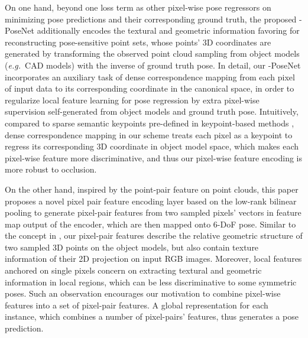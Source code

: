\documentclass[letterpaper, 10 pt, conference]{ieeeconf}
\def\eg{\emph{e.g.~}} \def\Eg{\emph{E.g.}~}
\begin{document}
On one hand, beyond one loss term as other pixel-wise pose regressors \cite{wang2019densefusion,cheng20196d} on minimizing pose predictions and their corresponding ground truth, the proposed -PoseNet additionally encodes the textural and geometric information favoring for reconstructing pose-sensitive point sets, 
whose points' 3D coordinates are generated by transforming the observed point cloud sampling from object models (\eg CAD models) with the inverse of ground truth pose.  
In detail, our -PoseNet incorporates an auxiliary task of dense correspondence mapping from each pixel of input data to its corresponding coordinate in the canonical space, in order to regularize local feature learning for pose regression by extra pixel-wise supervision self-generated from object models and ground truth pose. 
Intuitively, compared to sparse semantic keypoints pre-defined in keypoint-based methods \cite{newell2016stacked,oberweger2018making,pavlakos20176,rad2017bb8,peng2019pvnet}, dense correspondence mapping in our scheme treats each pixel as a keypoint to regress its corresponding 3D coordinate in object model space, which makes each pixel-wise feature more discriminative, and thus our pixel-wise feature encoding is more robust to occlusion. 
 
On the other hand, inspired by the point-pair feature \cite{drost2010model,hinterstoisser2016going} on point clouds, this paper proposes a novel pixel pair feature encoding layer based on the low-rank bilinear pooling \cite{kong2017low,wei2018grassmann} to generate pixel-pair features from two sampled pixels' vectors in feature map output of the encoder, which are then mapped onto 6-DoF pose.
Similar to the concept in \cite{drost2010model,hinterstoisser2016going}, our pixel-pair features describe the relative geometric structure of two sampled 3D points on the object models, but also contain texture information of their 2D projection on input RGB images.
Moreover, local features anchored on single pixels concern on extracting textural and geometric information in local regions, which can be less discriminative to some symmetric poses.
Such an observation encourages our motivation to combine pixel-wise features into a set of pixel-pair features.
A global representation for each instance, which combines a number of pixel-pairs' features, thus generates a pose prediction. 
\end{document}
